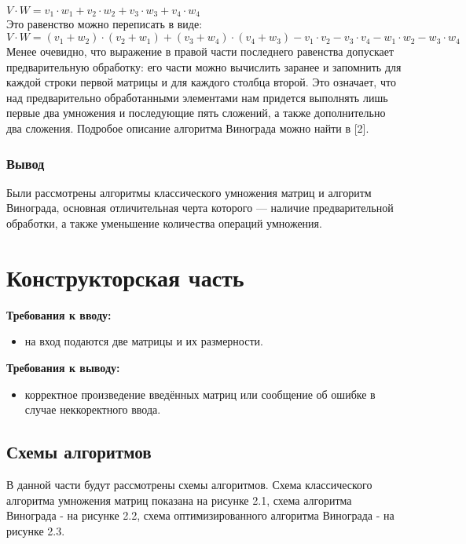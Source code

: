 \documentclass[12pt]{report}
\begin{document}
$ V \cdot W=v_1 \cdot w_1 + v_2 \cdot w_2 + v_3 \cdot w_3 + v_4 \cdot w_4$ \\

Это равенство можно переписать в виде: \\
$V \cdot W=(v_1 + w_2) \cdot (v_2 + w_1) + (v_3 + w_4) \cdot (v_4 + w_3) - v_1 \cdot v_2 - v_3 \cdot v_4 - w_1 \cdot w_2 - w_3 \cdot w_4$\\

Менее очевидно, что выражение в правой части последнего равенства допускает предварительную обработку: его части можно вычислить заранее и запомнить для каждой строки первой матрицы и для каждого столбца второй. 
Это означает, что над предварительно обработанными элементами нам придется выполнять лишь первые два умножения и последующие пять сложений, а также дополнительно два сложения. Подробое описание алгоритма Винограда можно найти в [2].

\subsection{Вывод}
Были рассмотрены алгоритмы классического умножения матриц и алгоритм Винограда, основная отличительная черта которого — наличие предварительной обработки, а также уменьшение количества операций умножения.


\chapter{Конструкторская часть}
\textbf{Требования к вводу:}\\
\begin{itemize}
	\item на вход подаются две матрицы и их размерности.
\end{itemize}

\textbf{Требования к выводу:}\\
\begin{itemize}
	\item корректное произведение введённых матриц или сообщение об ошибке в случае неккоректного ввода.
\end{itemize}


\section{Схемы алгоритмов}
В данной части будут рассмотрены схемы алгоритмов. Схема классического алгоритма умножения матриц показана на рисунке 2.1, схема алгоритма Винограда - на рисунке 2.2, схема оптимизированного алгоритма Винограда - на рисунке 2.3.
\end{document}
